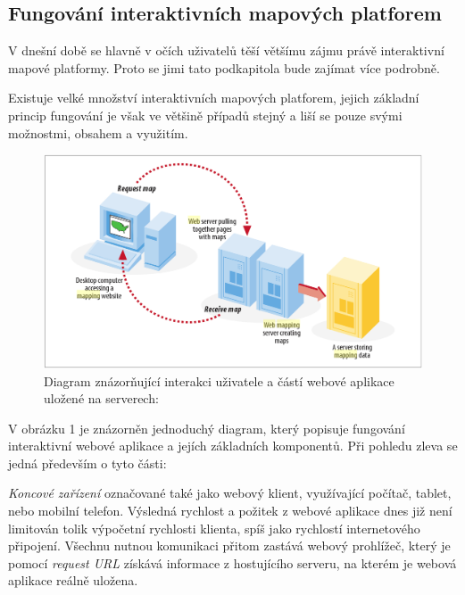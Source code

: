 \newpage
\subsection{Fungování interaktivních mapových platforem}

V dnešní době se hlavně v očích uživatelů těší většímu zájmu právě
interaktivní mapové platformy. Proto se jimi tato podkapitola bude
zajímat více podrobně.

Existuje velké množství interaktivních mapových platforem, jejich
základní princip fungování je však ve většině případů stejný a liší se
pouze svými možnostmi, obsahem a využitím.

\begin{figure}[h!]
	\centering
	\includegraphics[width=1\textwidth]{../img/map-web-diagram.png}
	\caption{Diagram znázorňující interakci uživatele a částí webové aplikace uložené na serverech: \cite{web_mapping}}
	\label{fig:WPS_class_diagram}
\end{figure}

V obrázku 1 je znázorněn jednoduchý diagram, který popisuje fungování
interaktivní webové aplikace a jejích základních komponentů. Při
pohledu zleva se jedná především o tyto části:

\textit{Koncové zařízení} označované také jako webový klient,
využívající počítač, tablet, nebo mobilní telefon. Výsledná rychlost a
požitek z webové aplikace dnes již není limitován tolik výpočetní
rychlosti klienta, spíš jako rychlostí internetového
připojení. Všechnu nutnou komunikaci přitom zastává webový prohlížeč,
který je pomocí \textit{request URL} získává informace z hostujícího
serveru, na kterém je webová aplikace reálně uložena.

